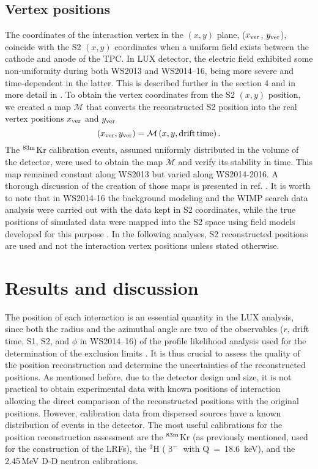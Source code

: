 \documentclass[a4paper,11pt]{article}
\begin{document}
\subsection{Vertex positions}

The coordinates of the interaction vertex in the $(x, y)$ plane, ($x_{\rm ver}$, $y_{\rm ver}$), coincide with the S2 $(x, y)$ coordinates when a uniform field exists between the cathode and anode of the TPC. In LUX detector, the electric field exhibited some non-uniformity during both  WS2013 and WS2014--16, being more severe and time-dependent in the latter. This is described further in the section 4 and in more detail in \cite{hertel2015, Fields2017}. To obtain the vertex coordinates from the S2 $(x, y)$ position, we created a map $\mathcal{M}$ that converts the reconstructed S2 position into the real vertex positions $x_{\rm ver}$ and $y_{\rm ver}$ 
\begin{equation}
(x_{\rm ver}, y_{\rm ver}) = \mathcal{M}\left(x, y, {\rm drift\,time} \right).
\label{eq_vertex_positions}
\end{equation}
The ${}^{{\rm 83m}}$Kr calibration events, assumed uniformly distributed in the volume of the detector, were used to obtain the map $\mathcal{M}$ and verify its stability in time. This map remained constant along WS2013 but varied along WS2014-2016. A thorough discussion of the creation of those maps is presented in ref. \cite{hertel2015}. It is worth to note that in WS2014-16 the background modeling and the WIMP search data analysis were carried out with the data kept in S2 coordinates, while the true positions of simulated data were mapped into the S2 space using field models developed for this purpose \cite{LUX2016_SSR}. In the following analyses, S2 reconstructed positions are used and not the interaction vertex positions unless stated otherwise.

\section{Results and discussion\label{section_krypton_results}}

The position of each interaction is an essential quantity in the LUX analysis, since both the radius and the azimuthal angle are two of the observables ($r$,  drift time, S1, S2, and $\phi$ in WS2014--16) of the profile likelihood analysis used for the determination of the exclusion limits \cite{LUX2016_SSR}. It is thus crucial to assess the quality of the position reconstruction and determine the uncertainties of the reconstructed positions. As mentioned before, due to the detector design and size, it is not practical to obtain experimental data with known positions of interaction allowing the direct comparison of  the reconstructed positions with the original positions. However, calibration data from dispersed sources have a known distribution of events in the detector. The most useful calibrations for the position reconstruction assessment are the $^{\rm 83m}$Kr (as previously mentioned, used for the construction of the LRFs), the ${}^{3}$H ($\upbeta^-$ with Q~=~18.6~keV), and the 2.45\,MeV D-D neutron calibrations.
\end{document}
